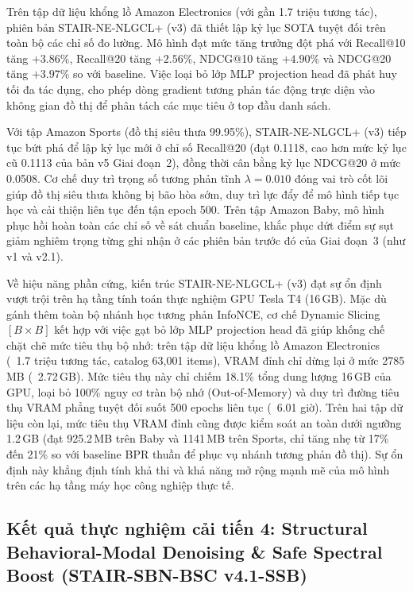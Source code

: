 Trên tập dữ liệu khổng lồ Amazon Electronics (với gần 1.7 triệu tương tác), phiên bản STAIR-NE-NLGCL+ (v3) đã thiết lập kỷ lục SOTA tuyệt đối trên toàn bộ các chỉ số đo lường. Mô hình đạt mức tăng trưởng đột phá với Recall@10 tăng $+3.86\%$, Recall@20 tăng $+2.56\%$, NDCG@10 tăng $+4.90\%$ và NDCG@20 tăng $+3.97\%$ so với baseline. Việc loại bỏ lớp MLP projection head đã phát huy tối đa tác dụng, cho phép dòng gradient tương phản tác động trực diện vào không gian đồ thị để phân tách các mục tiêu ở top đầu danh sách.

Với tập Amazon Sports (đồ thị siêu thưa 99.95\%), STAIR-NE-NLGCL+ (v3) tiếp tục bứt phá để lập kỷ lục mới ở chỉ số Recall@20 (đạt 0.1118, cao hơn mức kỷ lục cũ 0.1113 của bản v5 Giai đoạn~2), đồng thời cân bằng kỷ lục NDCG@20 ở mức 0.0508. Cơ chế duy trì trọng số tương phản tĩnh $\lambda = 0.010$ đóng vai trò cốt lõi giúp đồ thị siêu thưa không bị bão hòa sớm, duy trì lực đẩy để mô hình tiếp tục học và cải thiện liên tục đến tận epoch 500. Trên tập Amazon Baby, mô hình phục hồi hoàn toàn các chỉ số về sát chuẩn baseline, khắc phục dứt điểm sự sụt giảm nghiêm trọng từng ghi nhận ở các phiên bản trước đó của Giai đoạn~3 (như v1 và v2.1).

Về hiệu năng phần cứng, kiến trúc STAIR-NE-NLGCL+ (v3) đạt sự ổn định vượt trội trên hạ tầng tính toán thực nghiệm GPU Tesla T4 (16\,GB). Mặc dù gánh thêm toàn bộ nhánh học tương phản InfoNCE, cơ chế Dynamic Slicing $[B \times B]$ kết hợp với việc gạt bỏ lớp MLP projection head đã giúp khống chế chặt chẽ mức tiêu thụ bộ nhớ: trên tập dữ liệu khổng lồ Amazon Electronics (~1.7 triệu tương tác, catalog 63,001 items), VRAM đỉnh chỉ dừng lại ở mức 2785\,MB (~2.72\,GB). Mức tiêu thụ này chỉ chiếm 18.1\% tổng dung lượng 16\,GB của GPU, loại bỏ 100\% nguy cơ tràn bộ nhớ (Out-of-Memory) và duy trì đường tiêu thụ VRAM phẳng tuyệt đối suốt 500 epochs liên tục (~6.01 giờ). Trên hai tập dữ liệu còn lại, mức tiêu thụ VRAM đỉnh cũng được kiểm soát an toàn dưới ngưỡng 1.2\,GB (đạt 925.2\,MB trên Baby và 1141\,MB trên Sports, chỉ tăng nhẹ từ 17\% đến 21\% so với baseline BPR thuần để phục vụ nhánh tương phản đồ thị). Sự ổn định này khẳng định tính khả thi và khả năng mở rộng mạnh mẽ của mô hình trên các hạ tầng máy học công nghiệp thực tế.

\subsection{Kết quả thực nghiệm cải tiến 4: Structural Behavioral-Modal Denoising \& Safe Spectral Boost (STAIR-SBN-BSC v4.1-SSB)}

